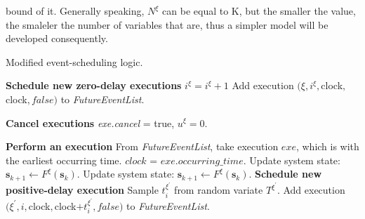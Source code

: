 \documentclass[]{interact}
\theoremstyle{plain}%
\theoremstyle{definition}
\theoremstyle{remark}
\begin{document}
bound of it. Generally speaking, $N^{\xi}$ can be equal to K, but the smaller the value, the smaleler the number of variables that are, thus a simpler model will be developed consequently.
\begin{algorithm}
	\label{algo:modified_DES}
	\caption{Modified event-scheduling logic.}
	\begin{algorithmic}[1]
		\STATE \textbf{Schedule new zero-delay executions}
		\STATE $i^{\xi} = i^{\xi}+1$
		\STATE Add execution $(\xi,i^{\xi},$clock$,$clock$,false)$ to \textit{FutureEventList}.
		\ENDIF
		\ENDFOR
		\STATE
		
		\STATE \textbf{Cancel executions}
		\STATE \textit{exe.cancel} = true, $u^{\xi}=0$.
		\ENDIF
		\ENDFOR
		
		\STATE
		\STATE \textbf{Perform an execution}
		\STATE From \textit{FutureEventList}, take execution $exe$, which is with the earliest occurring time. 
		\STATE $clock$ = $exe.occurring\_time$.
		\STATE Update system state: $\textbf{s}_{k+1}\leftarrow F^{\xi}(\textbf{s}_{k})$.
		\ENDIF
		\ELSE
		\STATE Update system state: $\textbf{s}_{k+1}\leftarrow F^{\xi}(\textbf{s}_{k})$.
		\STATE \textbf{Schedule new positive-delay execution}
		\STATE Sample $t^{\xi^{'}}_{i}$ from random variate $T^{\xi^{'}}$.
		\STATE Add execution $(\xi^{'},i,$clock$,$clock$+t^{\xi^{'}}_{i},false)$ to \textit{FutureEventList}.
		\ENDIF		
		\ENDIF
		
		\ENDFOR
	\end{algorithmic}
\end{algorithm}
\end{document}
